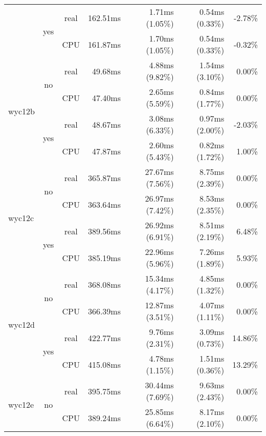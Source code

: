 \documentclass[en]{pracamgr}
\begin{document}
\begin{small}
\begin{longtable}{|l|c|c|r|r|r|r|}
                          \cline{2-7}
                          & \multirow{2}{*}{yes} & real & 162.51ms & 1.71ms (1.05\%) & 0.54ms (0.33\%) & -2.78\% \\*
                          &                      & CPU  & 161.87ms & 1.70ms (1.05\%) & 0.54ms (0.33\%) & -0.32\% \\
\hline
\multirow{4}{*}{wyc12b}   & \multirow{2}{*}{no}  & real & 49.68ms & 4.88ms (9.82\%) & 1.54ms (3.10\%) & 0.00\% \\*
                          &                      & CPU  & 47.40ms & 2.65ms (5.59\%) & 0.84ms (1.77\%) & 0.00\% \\*
                          \cline{2-7}
                          & \multirow{2}{*}{yes} & real & 48.67ms & 3.08ms (6.33\%) & 0.97ms (2.00\%) & -2.03\% \\*
                          &                      & CPU  & 47.87ms & 2.60ms (5.43\%) & 0.82ms (1.72\%) & 1.00\% \\
\hline
\multirow{4}{*}{wyc12c}   & \multirow{2}{*}{no}  & real & 365.87ms & 27.67ms (7.56\%) & 8.75ms (2.39\%) & 0.00\% \\*
                          &                      & CPU  & 363.64ms & 26.97ms (7.42\%) & 8.53ms (2.35\%) & 0.00\% \\*
                          \cline{2-7}
                          & \multirow{2}{*}{yes} & real & 389.56ms & 26.92ms (6.91\%) & 8.51ms (2.19\%) & 6.48\% \\*
                          &                      & CPU  & 385.19ms & 22.96ms (5.96\%) & 7.26ms (1.89\%) & 5.93\% \\
\hline
\multirow{4}{*}{wyc12d}   & \multirow{2}{*}{no}  & real & 368.08ms & 15.34ms (4.17\%) & 4.85ms (1.32\%) & 0.00\% \\*
                          &                      & CPU  & 366.39ms & 12.87ms (3.51\%) & 4.07ms (1.11\%) & 0.00\% \\*
                          \cline{2-7}
                          & \multirow{2}{*}{yes} & real & 422.77ms & 9.76ms (2.31\%) & 3.09ms (0.73\%) & 14.86\% \\*
                          &                      & CPU  & 415.08ms & 4.78ms (1.15\%) & 1.51ms (0.36\%) & 13.29\% \\
\hline
\multirow{4}{*}{wyc12e}   & \multirow{2}{*}{no}  & real & 395.75ms & 30.44ms (7.69\%) & 9.63ms (2.43\%) & 0.00\% \\*
                          &                      & CPU  & 389.24ms & 25.85ms (6.64\%) & 8.17ms (2.10\%) & 0.00\% \\*

\end{longtable}
\end{small}
\end{document}
